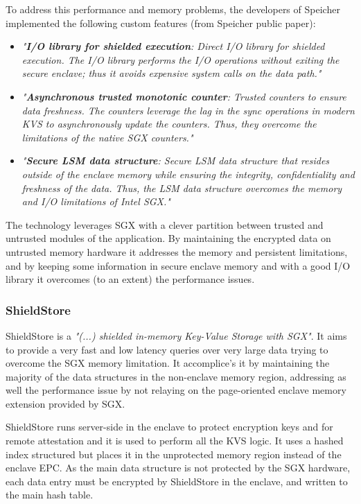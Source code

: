 To address this performance and memory problems, the developers of Speicher implemented the following custom features (from Speicher public paper):

\begin{itemize}
	\item \textit{"\textbf{I/O library for shielded execution}: Direct \gls{I/O} library for shielded execution. The \gls{I/O} library performs the \gls{I/O} operations without exiting the secure enclave; thus it avoids expensive system calls on the data path."}
	
	\item \textit{"\textbf{Asynchronous trusted monotonic counter}: Trusted counters to ensure data freshness. The counters leverage the lag in the sync operations in modern \gls{KVS} to asynchronously update the counters. Thus, they overcome the limitations of the native \gls{SGX} counters."}
	
	\item \textit{"\textbf{Secure \gls{LSM} data structure}: Secure \gls{LSM} data structure that resides outside of the enclave memory while ensuring the integrity, confidentiality and freshness of the data. Thus, the \gls{LSM} data structure overcomes the memory and \gls{I/O} limitations of Intel \gls{SGX}."}
\end{itemize}

The technology leverages \gls{SGX} with a clever partition between trusted and untrusted modules of the application. By maintaining the encrypted data on untrusted memory hardware it addresses the memory and persistent limitations, and by keeping some information in secure enclave memory and with a good \gls{I/O} library it overcomes (to an extent) the performance issues.

\subsubsection{ShieldStore}
\label{sssec:shieldstore}

ShieldStore \cite{shieldstore:1} is a \textit{"(...) shielded in-memory Key-Value Storage with \gls{SGX}"}. It aims to provide a very fast and low latency queries over very large data trying to overcome the \gls{SGX} memory limitation. It accomplice's it by maintaining the majority of the data structures in the non-enclave memory region, addressing as well the performance issue by not relaying on the page-oriented enclave memory extension provided by \gls{SGX}.

ShieldStore runs server-side in the enclave to protect encryption keys and for remote attestation and it is used to perform all the \gls{KVS} logic. It uses a hashed index structured but places it in the unprotected memory region instead of the enclave \gls{EPC}. As the main data structure is not protected by the \gls{SGX} hardware, each data entry must be encrypted by ShieldStore in the enclave, and written to the main hash table.


